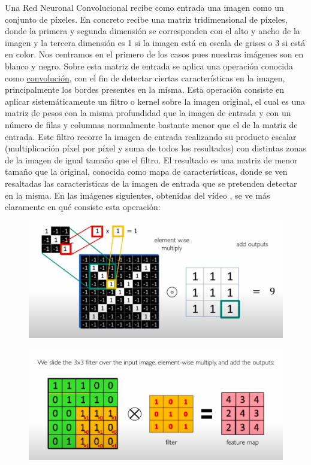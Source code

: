\documentclass[a4paper,11pt]{article}
\begin{document}
Una Red Neuronal Convolucional recibe como entrada una imagen como un conjunto de píxeles. En concreto recibe una matriz tridimensional de píxeles, donde la primera y segunda dimensión se corresponden con el alto y ancho de la imagen y la tercera dimensión es 1 si la imagen está en escala de grises o 3 si está en color. Nos centramos en el primero de los casos pues nuestras imágenes son en blanco y negro. Sobre esta matriz de entrada se aplica una operación conocida como \underline{convolución}, con el fin de detectar ciertas características en la imagen, principalmente los bordes presentes en la misma. Esta operación consiste en aplicar sistemáticamente un filtro o kernel sobre la imagen original, el cual es una matriz de pesos con la misma profundidad que la imagen de entrada y con un número de filas y columnas normalmente bastante menor que el de la matriz de entrada. Este filtro recorre la imagen de entrada realizando su producto escalar (multiplicación píxel por píxel y suma de todos los resultados) con distintas zonas de la imagen de igual tamaño que el filtro. El resultado es una matriz de menor tamaño que la original, conocida como mapa de características, donde se ven resaltadas las características de la imagen de entrada que se pretenden detectar en la misma. En las imágenes siguientes, obtenidas del vídeo \cite{2}, se ve más claramente en qué consiste esta operación:

\begin{figure}[H]
	\centering
	\includegraphics[width=1\linewidth]{img/conv1}
	\caption{}
	\label{fig:conv1}
\end{figure}
\begin{figure}[H]
	\centering
	\includegraphics[width=1\linewidth]{img/conv2}
	\caption{}
	\label{fig:conv2}
\end{figure}
\end{document}
